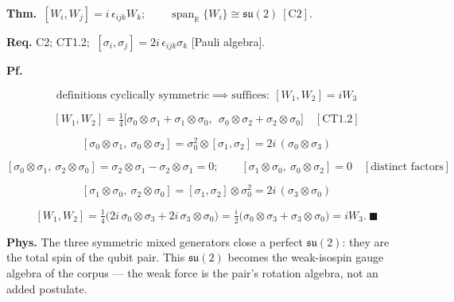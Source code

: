 \begin{theorem}\label{tag:CT1-4}
\textbf{Thm.} $\ [W_i,W_j]=i\,\epsilon_{ijk}W_k;\qquad\operatorname{span}_{\mathbb R}\{W_i\}\cong\mathfrak{su}(2)\ [\mathrm{C2}].$

\textbf{Req.} C2; CT1.2; $\ [\sigma_i,\sigma_j]=2i\,\epsilon_{ijk}\sigma_k$ [Pauli algebra].

\textbf{Pf.}

\[
\text{definitions cyclically symmetric}\implies\text{suffices}:\ [W_1,W_2]=iW_3
\]

\[
[W_1,W_2]=\tfrac14\bigl[\sigma_0\otimes\sigma_1+\sigma_1\otimes\sigma_0,\ \ \sigma_0\otimes\sigma_2+\sigma_2\otimes\sigma_0\bigr]\quad[\mathrm{CT1.2}]
\]

\[
[\sigma_0\otimes\sigma_1,\ \sigma_0\otimes\sigma_2]=\sigma_0^2\otimes[\sigma_1,\sigma_2]=2i\,(\sigma_0\otimes\sigma_3)
\]

\[
[\sigma_0\otimes\sigma_1,\ \sigma_2\otimes\sigma_0]=\sigma_2\otimes\sigma_1-\sigma_2\otimes\sigma_1=0;\qquad
[\sigma_1\otimes\sigma_0,\ \sigma_0\otimes\sigma_2]=0\quad[\text{distinct factors}]
\]

\[
[\sigma_1\otimes\sigma_0,\ \sigma_2\otimes\sigma_0]=[\sigma_1,\sigma_2]\otimes\sigma_0^2=2i\,(\sigma_3\otimes\sigma_0)
\]

\[
[W_1,W_2]=\tfrac14\bigl(2i\,\sigma_0\otimes\sigma_3+2i\,\sigma_3\otimes\sigma_0\bigr)=\tfrac i2\bigl(\sigma_0\otimes\sigma_3+\sigma_3\otimes\sigma_0\bigr)=iW_3.\ \blacksquare
\]

\textbf{Phys.} The three symmetric mixed generators close a perfect $\mathfrak{su}(2)$: they are the total spin of the qubit pair. This $\mathfrak{su}(2)$ becomes the weak-isospin gauge algebra of the corpus — the weak force is the pair’s rotation algebra, not an added postulate.

\end{theorem}

